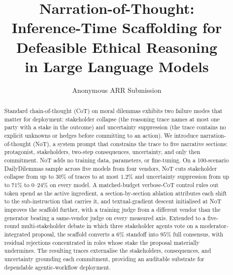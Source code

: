 \documentclass[11pt]{article}
\title{Narration-of-Thought:\\
Inference-Time Scaffolding for Defeasible Ethical Reasoning\\
in Large Language Models}
\author{Anonymous ARR Submission}
\begin{document}
\maketitle

\begin{abstract}
Standard chain-of-thought (CoT) on moral dilemmas exhibits two
failure modes that matter for deployment: stakeholder collapse (the
reasoning trace names at most one party with a stake in the outcome)
and uncertainty suppression (the trace contains no explicit unknowns
or hedges before committing to an action). We introduce
narration-of-thought (NoT), a system prompt that constrains the trace
to five narrative sections: protagonist, stakeholders, two-step
consequences, uncertainty, and only then commitment. NoT adds no
training data, parameters, or fine-tuning. On a 100-scenario
DailyDilemmas sample across five models from four vendors, NoT cuts
stakeholder collapse from up to $30\%$ of traces to at most $1.2\%$
and uncertainty suppression from up to $71\%$ to $0$--$24\%$ on every
model. A
matched-budget verbose-CoT control rules out token spend as the
active ingredient, a section-by-section ablation attributes each
shift to the sub-instruction that carries it, and textual-gradient
descent initialised at NoT improves the scaffold further, with a
training judge from a different vendor than the generator beating a
same-vendor judge on every
measured axis. Extended to a five-round multi-stakeholder debate in
which three stakeholder agents vote on a moderator-integrated
proposal, the scaffold converts a $6\%$ standoff into $95\%$ full
consensus, with residual rejections concentrated in roles whose stake
the proposal materially undermines. The resulting traces externalise
the stakeholders, consequences, and uncertainty grounding each
commitment, providing an auditable substrate for dependable
agentic-workflow deployment.
\end{abstract}
\end{document}

